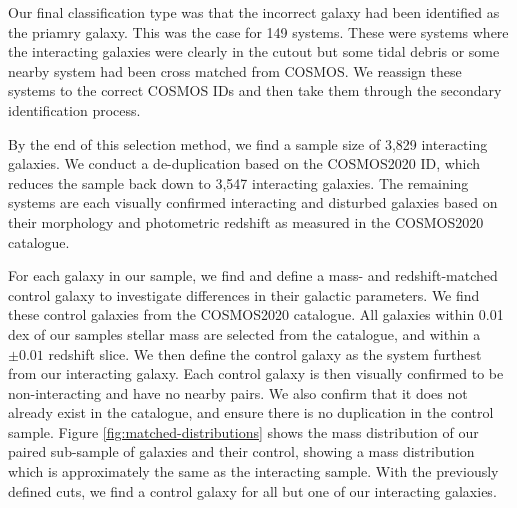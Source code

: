 Our final classification type was that the incorrect galaxy had been identified as the priamry galaxy. This was the case for 149 systems. These were systems where the interacting galaxies were clearly in the cutout but some tidal debris or some nearby system had been cross matched from COSMOS. We reassign these systems to the correct COSMOS IDs and then take them through the secondary identification process.

By the end of this selection method, we find a sample size of 3,829 interacting galaxies. We conduct a de-duplication based on the COSMOS2020 ID, which reduces the sample back down to 3,547 interacting galaxies. The remaining systems are each visually confirmed interacting and disturbed galaxies based on their morphology and photometric redshift as measured in the COSMOS2020 catalogue.

For each galaxy in our sample, we find and define a mass- and redshift-matched control galaxy to investigate differences in their galactic parameters. We find these control galaxies from the COSMOS2020 catalogue. All galaxies within 0.01 dex of our samples stellar mass are selected from the catalogue, and within a $\pm0.01$ redshift slice. We then define the control galaxy as the system furthest from our interacting galaxy. Each control galaxy is then visually confirmed to be non-interacting and have no nearby pairs. We also confirm that it does not already exist in the catalogue, and ensure there is no duplication in the control sample. Figure \ref{fig:matched-distributions} shows the mass distribution of our paired sub-sample of galaxies and their control, showing a mass distribution which is approximately the same as the interacting sample. With the previously defined cuts, we find a control galaxy for all but one of our interacting galaxies.

